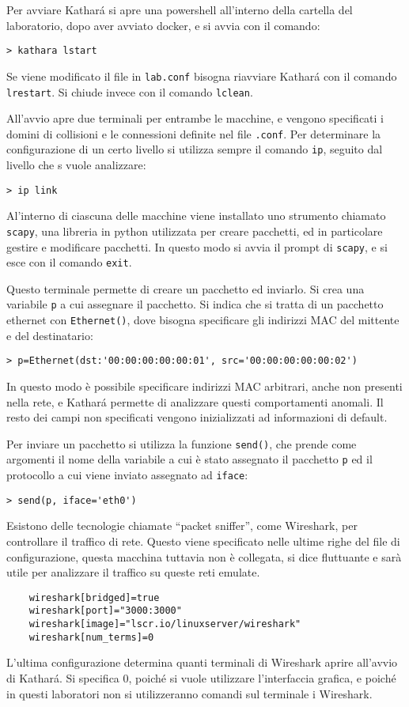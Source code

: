 \documentclass{article}
\numberwithin{equation}{subsection}
\begin{document}
Per avviare Kathar\'{a} si apre una powershell all'interno della cartella del laboratorio, dopo aver avviato docker, e si avvia con il comando:
\begin{verbatim}
> kathara lstart
\end{verbatim}

Se viene modificato il file in \verb|lab.conf| bisogna riavviare Kathará con il comando \verb|lrestart|. Si chiude invece con il comando \verb|lclean|. 

All'avvio apre due terminali per entrambe le macchine, e vengono specificati i domini di collisioni e le connessioni definite nel file \verb|.conf|. 
Per determinare la configurazione di un certo livello si utilizza sempre il comando \verb|ip|, seguito dal livello che s vuole analizzare:
\begin{verbatim}
> ip link
\end{verbatim}

Al'interno di ciascuna delle macchine viene installato uno strumento chiamato \verb|scapy|, una libreria in python utilizzata per creare pacchetti, ed in particolare 
gestire e modificare pacchetti. In questo modo si avvia il prompt di \verb|scapy|, e si esce con il comando \verb|exit|. 

Questo terminale permette di creare un pacchetto ed inviarlo. Si crea una variabile \verb|p| a cui assegnare il pacchetto. Si indica che si tratta di un 
pacchetto ethernet con \verb|Ethernet()|, dove bisogna specificare gli indirizzi MAC del mittente e del destinatario:
\begin{verbatim}
> p=Ethernet(dst:'00:00:00:00:00:01', src='00:00:00:00:00:02')
\end{verbatim} 
In questo modo è possibile specificare indirizzi MAC arbitrari, anche non presenti nella rete, e Kathar\'{a} permette di analizzare questi comportamenti anomali. 
Il resto dei campi non specificati vengono inizializzati ad informazioni di default. 

Per inviare un pacchetto si utilizza la funzione \verb|send()|, che prende come argomenti il nome della variabile a cui è stato assegnato il pacchetto \verb|p| ed 
il protocollo a cui viene inviato assegnato ad \verb|iface|:
\begin{verbatim}
> send(p, iface='eth0')
\end{verbatim}

Esistono delle tecnologie chiamate ``packet sniffer'', come Wireshark, per controllare il traffico di rete. Questo viene specificato nelle ultime righe del 
file di configurazione, questa macchina tuttavia non è collegata, si dice fluttuante e sarà utile per analizzare il traffico su queste reti emulate. 
\begin{verbatim}
	wireshark[bridged]=true
	wireshark[port]="3000:3000"
	wireshark[image]="lscr.io/linuxserver/wireshark"
	wireshark[num_terms]=0
\end{verbatim}
L'ultima configurazione determina quanti terminali di Wireshark aprire all'avvio di Kathar\'{a}. Si specifica 0, poiché si vuole utilizzare l'interfaccia grafica, e 
poiché in questi laboratori non si utilizzeranno comandi sul terminale i Wireshark. 
\end{document}
